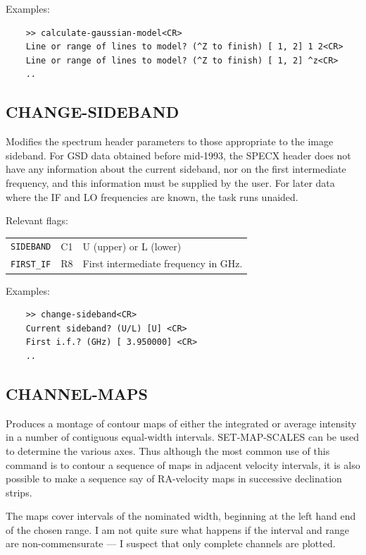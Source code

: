 \documentclass[11pt,twoside]{report}
\begin{document}
Examples:
\begin{verbatim}
    >> calculate-gaussian-model<CR>
    Line or range of lines to model? (^Z to finish) [ 1, 2] 1 2<CR>
    Line or range of lines to model? (^Z to finish) [ 1, 2] ^z<CR>
    ..
\end{verbatim}

\subsection{CHANGE-SIDEBAND} 

Modifies the spectrum header parameters to those appropriate to the image
sideband. For GSD data obtained before mid-1993, the SPECX header does not have
any information about the current sideband, nor on the first intermediate
frequency, and this information must be supplied by the user. For later data
where the IF and LO frequencies are known, the task runs unaided.

Relevant flags:\\
\begin{tabular}{lll}
  \verb+SIDEBAND+ & C1 & U (upper) or L (lower) \\
  \verb+FIRST_IF+ & R8 & First intermediate frequency in GHz.
\end{tabular}

Examples:
\begin{verbatim}
    >> change-sideband<CR>
    Current sideband? (U/L) [U] <CR>
    First i.f.? (GHz) [ 3.950000] <CR>
    ..
\end{verbatim}

\subsection{CHANNEL-MAPS} 

Produces a montage of contour maps of either the integrated or average
intensity in a number of contiguous equal-width intervals. SET-MAP-SCALES
can be used to determine the various axes. Thus although the most common
use of this command is to contour a sequence of maps in adjacent velocity
intervals, it is also possible to make a sequence say of RA-velocity maps
in successive declination strips.

The maps cover intervals of the nominated width, beginning at the left hand end
of the chosen range. I am not quite sure what happens if the interval and range
are non-commensurate --- I suspect that only complete channels are plotted.
\end{document}

